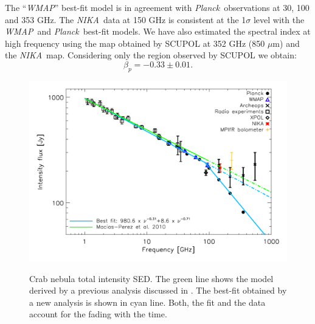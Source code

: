 \documentclass[twocolumn,traditabstract]{aa}
\def\NIKA{\textit{NIKA}}
\def\Planck{\textit{Planck}}
\def\WMAP{\textit{WMAP}}
\begin{document}
The ``\WMAP'' best-fit model is in agreement with \Planck\ observations at 30, 100 and 353 GHz. 
The \NIKA\ data at 150 GHz is consistent at the 1$\sigma$ level with the \WMAP\ and \Planck\ best-fit models.
We have also estimated the spectral index at high frequency using the map obtained by SCUPOL at 352 GHz (850 $\mu$m) and the \NIKA\ map. Considering only the region observed by SCUPOL we obtain:
\begin{equation}
\beta_p = -0.33 \pm 0.01.
\end{equation}

\begin{figure}
  \centering
          { \includegraphics[width=1\linewidth,keepaspectratio]{figures/Crab_SED_i_150.pdf}}
           \caption{Crab nebula total intensity SED. The green line shows the model derived by a previous analysis discussed in \citep{macias2010}. The best-fit obtained by a new analysis is shown in cyan line. Both, the fit and the data account for the fading with the time.}
\label{crab_SED}		
  \end{figure} 
\end{document}
